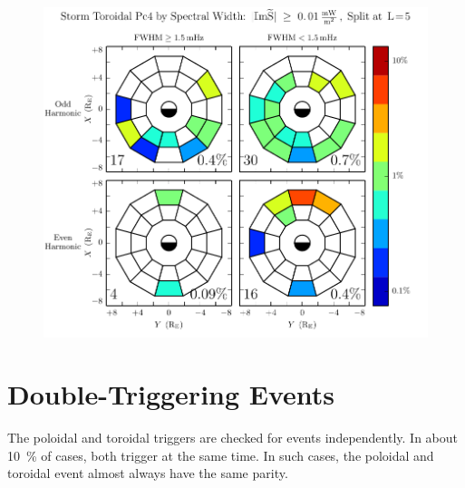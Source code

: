 \begin{figure}[!htb]
    \centering
    \includegraphics[width=\textwidth]{figures/fwhm_rate_t_storm.pdf}
    \caption[Toroidal Pc4 Rate by Compressional Coupling: Dst$< \SI{-30}{\nT}$]{
      \todo{$\cdots$}
    }
    \label{fig_fwhm_rate_t_storm}
\end{figure}

\section{Double-Triggering Events}

The poloidal and toroidal triggers are checked for events independently. In about \SI{10}{\percent} of cases, both trigger at the same time. In such cases, the poloidal and toroidal event almost always have the same parity. 


